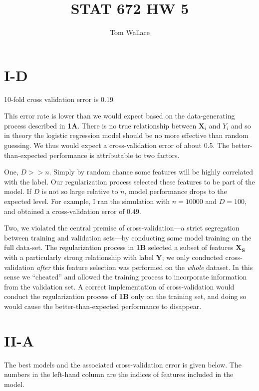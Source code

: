 \documentclass{article}
\title{STAT 672 HW 5}
\author{Tom Wallace}
\begin{document}
\maketitle

\section*{I-D}

10-fold cross validation error is 0.19

This error rate is lower than we would expect based on the data-generating
process described in \textbf{1A}. 
There is no true relationship between $\bm{X}_i$ and $Y_i$ and so in theory the logistic
regression model should be no more effective than random guessing. We thus would
expect a cross-validation error of about 0.5. The better-than-expected performance 
is attributable to two factors. 

One, $D >> n$. Simply by random chance some features will be highly correlated with the
label. Our regularization process selected these features to be part of the
model. If $D$ is not so large relative to $n$, model performance drops to the
expected level. For example, I ran the simulation with $n=10000$ and $D=100$,
and obtained a cross-validation error of 0.49.

Two, we violated the central premise of cross-validation---a strict segregation
between training and validation sets---by conducting some model training 
on the full data-set. The regularization process in \textbf{1B} selected a
subset of features $\bm{X_S}$ with a particularly strong relationship with label
$\bm{Y}$; we only conducted cross-validation \textit{after} this feature
selection was performed on the \textit{whole} dataset. In this sense we
``cheated'' and allowed the training process to incorporate information
from the validation set. A correct implementation of cross-validation would
conduct the regularization process of \textbf{1B} only on the training set, and
doing so would cause the better-than-expected performance to disappear.

\section*{II-A}

The best models and the associated cross-validation error is given below. The
numbers in the left-hand column are the indices of features included in the
model.
\end{document}
